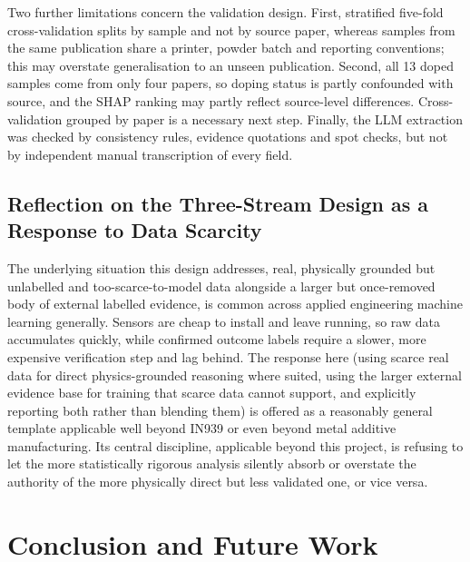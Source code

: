\documentclass[a4paper]{article}
\begin{document}
Two further limitations concern the validation design. First, stratified five-fold cross-validation splits by sample and not by source paper, whereas samples from the same publication share a printer, powder batch and reporting conventions; this may overstate generalisation to an unseen publication. Second, all 13 doped samples come from only four papers, so doping status is partly confounded with source, and the SHAP ranking may partly reflect source-level differences. Cross-validation grouped by paper is a necessary next step. Finally, the LLM extraction was checked by consistency rules, evidence quotations and spot checks, but not by independent manual transcription of every field.

\subsection{Reflection on the Three-Stream Design as a Response to Data Scarcity}
The underlying situation this design addresses, real, physically grounded but unlabelled and too-scarce-to-model data alongside a larger but once-removed body of external labelled evidence, is common across applied engineering machine learning generally. Sensors are cheap to install and leave running, so raw data accumulates quickly, while confirmed outcome labels require a slower, more expensive verification step and lag behind. The response here (using scarce real data for direct physics-grounded reasoning where suited, using the larger external evidence base for training that scarce data cannot support, and explicitly reporting both rather than blending them) is offered as a reasonably general template applicable well beyond IN939 or even beyond metal additive manufacturing. Its central discipline, applicable beyond this project, is refusing to let the more statistically rigorous analysis silently absorb or overstate the authority of the more physically direct but less validated one, or vice versa.

\section{Conclusion and Future Work}
\end{document}
